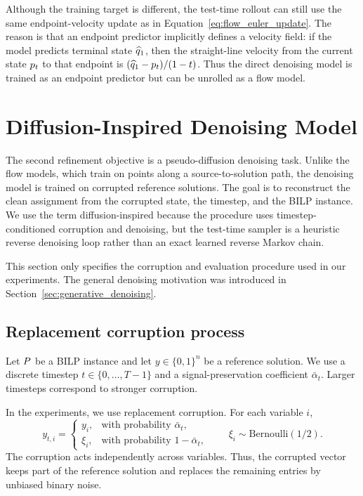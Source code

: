 Although the training target is different, the test-time rollout can still use the same endpoint-velocity update as in Equation~\eqref{eq:flow_euler_update}. The reason is that an endpoint predictor implicitly defines a velocity field: if the model predicts terminal state $\widehat {q}_1$, then the straight-line velocity from the current state $p_t$ to that endpoint is $(\widehat {q}_1-p_t)/(1-t)$. Thus the direct denoising model is trained as an endpoint predictor but can be unrolled as a flow model.

\section{Diffusion-Inspired Denoising Model}
\label{sec:diffusion_inspired_denoising_model}

The second refinement objective is a pseudo-diffusion denoising task. Unlike the flow models, which train on points along a source-to-solution path, the denoising model is trained on corrupted reference solutions. The goal is to reconstruct the clean assignment from the corrupted state, the timestep, and the BILP instance. We use the term diffusion-inspired because the procedure uses timestep-conditioned corruption and denoising, but the test-time sampler is a heuristic reverse denoising loop rather than an exact learned reverse Markov chain.

This section only specifies the corruption and evaluation procedure used in our experiments. The general denoising motivation was introduced in Section~\ref{sec:generative_denoising}.

\subsection{Replacement corruption process}
\label{subsec:replacement_corruption_process}

Let $P$ be a BILP instance and let $y\in\{0,1\}^n$ be a reference solution. We use a discrete timestep $t\in\{0,\ldots,T-1\}$ and a signal-preservation coefficient $\bar{\alpha}_t$. Larger timesteps correspond to stronger corruption.

In the experiments, we use replacement corruption. For each variable $i$,
\begin{equation}
    y_{t,i}
    =
    \begin{cases}
        y_i, & \text{with probability } \bar{\alpha}_t,\\
        \xi_i, & \text{with probability } 1-\bar{\alpha}_t,
    \end{cases}
    \qquad
    \xi_i \sim \mathrm{Bernoulli}(1/2).
    \label{eq:diffusion_replace_corruption}
\end{equation}
The corruption acts independently across variables. Thus, the corrupted vector keeps part of the reference solution and replaces the remaining entries by unbiased binary noise.


